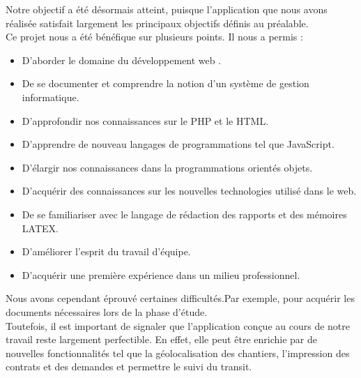 \documentclass{report}
\begin{document}
Notre objectif a été désormais atteint, puisque l’application que nous avons réalisée satisfait largement les principaux objectifs définis au préalable.\\
Ce projet nous a été bénéfique sur plusieurs points. Il nous a permis :
\begin{itemize}
    \item D’aborder le domaine du développement web .
    \item De se documenter et comprendre la notion d'un système de gestion informatique.
    \item D’approfondir nos connaissances sur le PHP et le HTML.
    \item D’apprendre de nouveau langages de programmations tel que JavaScript.
    \item D'élargir nos connaissances dans la programmations orientés objets.
    \item D’acquérir des connaissances sur les nouvelles technologies utilisé dans le web.
    \item De se familiariser avec le langage de rédaction des rapports et des mémoires LATEX.
    \item D’améliorer l’esprit du travail d’équipe.
    \item D’acquérir une première expérience dans un milieu professionnel.\\
\end{itemize}
Nous avons cependant éprouvé certaines difficultés.Par exemple, pour acquérir les documents nécessaires lors de la phase d'étude.\\
Toutefois, il est important de signaler que l'application conçue au cours de notre travail reste largement perfectible. En effet, elle peut être enrichie par de nouvelles fonctionnalités tel que la géolocalisation des chantiers, l’impression des contrats et des demandes et permettre le suivi du transit.

\Large



\appendix
\end{document}
